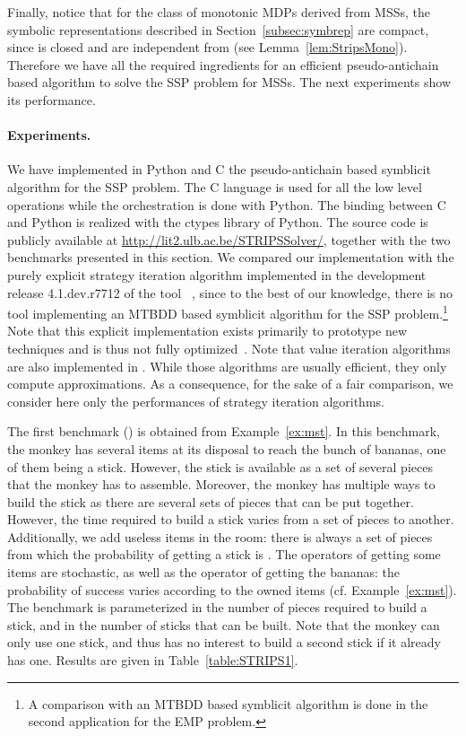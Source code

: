 Finally, notice that for the class of monotonic MDPs derived from MSSs, the symbolic representations described in Section~\ref{subsec:symbrep} are compact, since  is closed and   are independent from  (see Lemma~\ref{lem:StripsMono}).
Therefore we have all the required ingredients for an efficient pseudo-antichain based algorithm to solve the SSP problem for MSSs. The next experiments show its performance.

\paragraph{Experiments.} We have implemented  in Python and C the pseudo-antichain based symblicit algorithm for the SSP problem. The C language is used for all the low level operations while the orchestration is done with Python. The binding between C and Python is realized with the ctypes library of Python. The source code is publicly available at \url{http://lit2.ulb.ac.be/STRIPSSolver/}, together with the two benchmarks presented in this section. We compared our implementation with the purely explicit strategy iteration algorithm implemented in the development release 4.1.dev.r7712 of the tool ~\cite{KNP11}, since to the best of our knowledge, there is no tool implementing an MTBDD based symblicit algorithm for the SSP problem.\footnote{A comparison with an MTBDD based symblicit algorithm is done in the second application for the EMP problem.} Note that this explicit implementation exists primarily to prototype new techniques and is thus not fully optimized~\cite{Parker}. Note that value iteration algorithms are also implemented in . 
While those algorithms are usually efficient, they only compute approximations. As a consequence, for the sake of a fair comparison, we consider here only the performances of strategy iteration algorithms. 

\medskip
The first benchmark () is obtained from Example~\ref{ex:mst}. In this benchmark, the monkey has several items at its disposal to reach the bunch of bananas, one of them being a stick. However, the stick is available as a set of several pieces that the monkey has to assemble. Moreover, the monkey has multiple ways to build the stick as there are several sets of pieces that can be put together. However, the time required to build a stick varies from a set of pieces to another. Additionally, we add useless items in the room: there is always a set of pieces from which the probability of getting a stick is . The operators of getting some items are stochastic, as well as the operator of getting the bananas: the probability of success varies according to the owned items (cf. Example~\ref{ex:mst}). The benchmark is parameterized in the number  of pieces required to build a stick, and in the number  of sticks that can be built. Note that the monkey can only use one stick, and thus has no interest to build a second stick if it already has one. Results are given in Table~\ref{table:STRIPS1}. 

